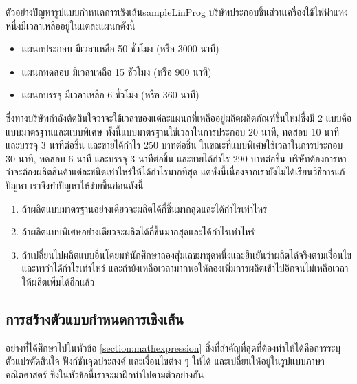 \begin{example}{ตัวอย่างปัญหารูปแบบกำหนดการเชิงเส้น}{sampleLinProg}
    บริษัทประกอบชิ้นส่วนเครื่องใช้ไฟฟ้าแห่งหนึ่งมีเวลาเหลืออยู่ในแต่ละแผนกดังนี้
    \begin{itemize}
        \item แผนกประกอบ มีเวลาเหลือ 50 ชั่วโมง (หรือ 3000 นาที)
        \item แผนกทดสอบ มีเวลาเหลือ 15 ชั่วโมง (หรือ 900 นาที)
        \item แผนกบรรจุ มีเวลาเหลือ 6 ชั่วโมง (หรือ 360 นาที)
    \end{itemize}
    ซึ่งทางบริษัทกำลังตัดสินใจว่าจะใช้เวลาของแต่ละแผนกที่เหลืออยู่ผลิตผลิตภัณฑ์ชิ้นใหม่ซึ่งมี 2 แบบคือแบบมาตรฐานและแบบพิเศษ
    ทั้งนี้แบบมาตรฐานใช้เวลาในการประกอบ 20 นาที, ทดสอบ 10 นาที และบรรจุ 3 นาทีต่อชิ้น และขายได้กำไร 250 บาทต่อชิ้น
    ในขณะที่แบบพิเศษใช้เวลาในการประกอบ 30 นาที, ทดสอบ 6 นาที และบรรจุ 3 นาทีต่อชิ้น และขายได้กำไร 290 บาทต่อชิ้น
    บริษัทต้องการหาว่าจะต้องผลิตสินค้าแต่ละชนิดเท่าไหร่ให้ได้กำไรมากที่สุด แต่ทั้งนี้เนื่องจากเรายังไม่ได้เรียนวิธีการแก้ปัญหา เราจึงทำปัญหาให้ง่ายขึ้นก่อนดังนี้
    \begin{enumerate}
        \item ถ้าผลิตแบบมาตรฐานอย่างเดียวจะผลิตได้กี่ชิ้นมากสุดและได้กำไรเท่าไหร่
        \item ถ้าผลิตแบบพิเศษอย่างเดียวจะผลิตได้กี่ชิ้นมากสุดและได้กำไรเท่าไหร่
        \item ถ้าเปลี่ยนไปผลิตแบบอื่นโดยมห้นักศึกษาลองสุ่มเลขมาชุดหนึ่งและยืนยันว่าผลิตได้จริงตามเงื่อนไข และหาว่าได้กำไรเท่าไหร่ และถ้ายังเหลือเวลามากพอให้ลองเพิ่มการผลิตเข้าไปอีกจนไม่เหลือเวลาให้ผลิตเพิ่มได้อีกแล้ว
    \end{enumerate}
\end{example}
\newpage
\subsection{การสร้างตัวแบบกำหนดการเชิงเส้น}
อย่างที่ได้ศึกษาไปในหัวข้อ \ref{section:mathexpression} สิ่งที่สำคัญที่สุดที่ต้องทำให้ได้คือการระบุตัวแปรตัดสินใจ ฟังก์ชันจุดประสงค์ และเงื่อนไขต่าง ๆ ให้ได้ และเปลี่ยนให้อยู่ในรูปแบบภาษาคณิตศาสตร์
ซึ่งในหัวข้อนี้เราจะมาฝึกทำไปตามตัวอย่างกัน

